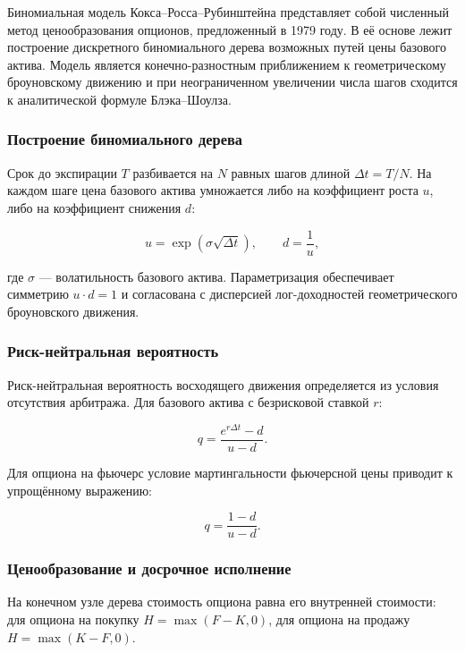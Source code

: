 \documentclass[11pt,a4paper]{article}
\begin{document}
Биномиальная модель Кокса--Росса--Рубинштейна представляет собой численный метод ценообразования опционов, предложенный в 1979 году. В её основе лежит построение дискретного биномиального дерева возможных путей цены базового актива. Модель является конечно-разностным приближением к геометрическому броуновскому движению и при неограниченном увеличении числа шагов сходится к аналитической формуле Блэка--Шоулза.

\subsubsection{Построение биномиального дерева}

Срок до экспирации $T$ разбивается на $N$ равных шагов длиной $\Delta t = T/N$. На каждом шаге цена базового актива умножается либо на коэффициент роста $u$, либо на коэффициент снижения $d$:

\begin{equation}
u = \exp(\sigma\sqrt{\Delta t}), \qquad d = \frac{1}{u},
\end{equation}

где $\sigma$ --- волатильность базового актива. Параметризация обеспечивает симметрию $u \cdot d = 1$ и согласована с дисперсией лог-доходностей геометрического броуновского движения.

\subsubsection{Риск-нейтральная вероятность}

Риск-нейтральная вероятность восходящего движения определяется из условия отсутствия арбитража. Для базового актива с безрисковой ставкой $r$:

\begin{equation}
q = \frac{e^{r\Delta t} - d}{u - d}.
\end{equation}

Для опциона на фьючерс условие мартингальности фьючерсной цены приводит к упрощённому выражению:

\begin{equation}
q = \frac{1 - d}{u - d}.
\end{equation}

\subsubsection{Ценообразование и досрочное исполнение}

На конечном узле дерева стоимость опциона равна его внутренней стоимости: для опциона на покупку $H = \max(F - K, 0)$, для опциона на продажу $H = \max(K - F, 0)$.
\end{document}
